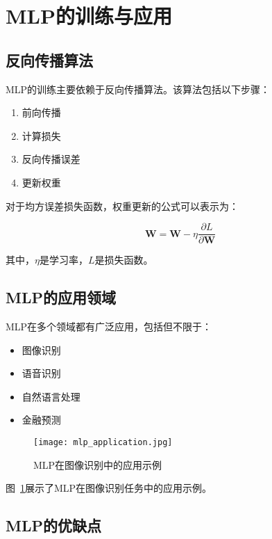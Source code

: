 \section{MLP的训练与应用}

\subsection{反向传播算法}

MLP的训练主要依赖于反向传播算法。该算法包括以下步骤：
\begin{enumerate}
    \item 前向传播
    \item 计算损失
    \item 反向传播误差
    \item 更新权重
\end{enumerate}

对于均方误差损失函数，权重更新的公式可以表示为：

\begin{equation}
    \mathbf{W} = \mathbf{W} - \eta \frac{\partial L}{\partial \mathbf{W}}
\end{equation}

其中，$\eta$是学习率，$L$是损失函数。

\subsection{MLP的应用领域}

MLP在多个领域都有广泛应用，包括但不限于：
\begin{itemize}
    \item 图像识别
    \item 语音识别
    \item 自然语言处理
    \item 金融预测
\end{itemize}

\begin{figure}
    \centering
    \texttt{[image: mlp\_application.jpg]}
    \caption{MLP在图像识别中的应用示例}
    \label{fig:mlp_application}
\end{figure}

图~\ref{fig:mlp_application}展示了MLP在图像识别任务中的应用示例。

\subsection{MLP的优缺点}

